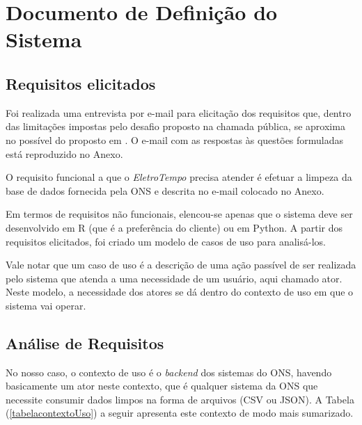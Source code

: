 \documentclass[a4paper, 12pt]{report}
\begin{document}
\chapter{Documento de Definição do Sistema}

\begin{doublespace}
\section{Requisitos elicitados}
Foi realizada uma entrevista por e-mail para elicitação dos requisitos que, dentro das limitações impostas pelo desafio proposto na chamada pública, se aproxima no possível do proposto em \cite{kotonya_sommerville1998}.  O e-mail com as respostas às questões formuladas está reproduzido no Anexo.

O requisito funcional a que o \textit{EletroTempo} \textsuperscript{\textregistered} precisa atender  é efetuar a limpeza da base de dados fornecida pela ONS e descrita no e-mail colocado no Anexo.

Em termos de requisitos não funcionais, elencou-se apenas que o sistema deve ser desenvolvido em R (que é a preferência do cliente) ou em Python. A partir dos requisitos elicitados, foi criado um modelo de casos de uso para analisá-los.

Vale notar que um caso de uso é a descrição de uma ação passível de ser realizada pelo sistema que atenda a uma necessidade de um usuário, aqui chamado ator. Neste modelo, a necessidade dos atores se dá dentro do contexto de uso em que o sistema vai operar. 


\section{Análise de Requisitos}
No nosso caso, o contexto de uso é o \textit{backend} dos sistemas do ONS, havendo basicamente um ator neste contexto, que é qualquer sistema da ONS que necessite consumir dados limpos na forma de arquivos (CSV ou JSON). A Tabela (\ref{tabelacontextoUso}) a seguir apresenta este contexto de modo mais sumarizado.



\begin{table}[H]
	\centering
	\caption{\label{tabelacontextoUso} \textbf{Contexto de uso}}
\end{table}
\end{doublespace}
\end{document}
